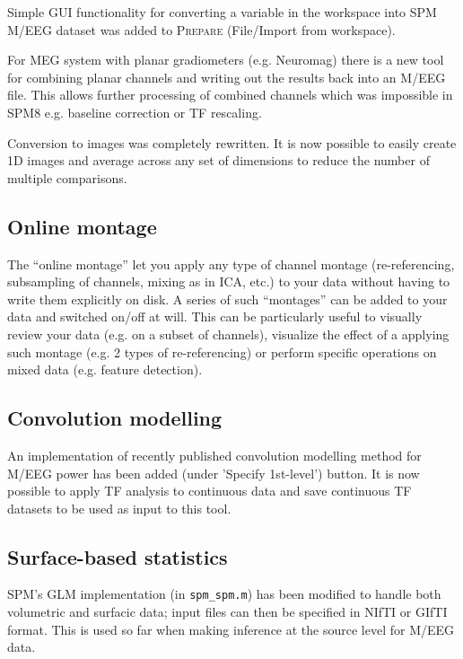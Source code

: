 \documentclass[a4paper,titlepage,openany]{article}
\begin{document}
Simple GUI functionality for converting a variable in the workspace into SPM M/EEG dataset was added to \textsc{Prepare} (File/Import from workspace).

For MEG system with planar gradiometers (e.g. Neuromag) there is a new tool for combining planar channels and writing out the results back into an M/EEG file. This allows further processing of combined channels which was impossible in SPM8 e.g. baseline correction or TF rescaling.

Conversion to images was completely rewritten. It is now possible to easily create 1D images and average across any set of dimensions to reduce the number of multiple comparisons.

\subsection{Online montage}

The ``online montage'' let you apply any type of channel montage (re-referencing, subsampling of channels, mixing as in ICA, etc.) to your data without having to write them explicitly on disk. A series of such ``montages'' can be added to your data and switched on/off at will. This can be particularly useful to visually review your data (e.g. on a subset of channels), visualize the effect of a applying such montage (e.g. 2 types of re-referencing) or perform specific operations on mixed data (e.g. feature detection).

\subsection{Convolution modelling}

An implementation of recently published convolution modelling method for M/EEG power \cite{Litvak_ConvModel_2013} has been added (under 'Specify 1st-level') button. It is now possible to apply TF analysis to continuous data and save continuous TF datasets to be used as input to this tool.

\subsection{Surface-based statistics}

SPM's GLM implementation (in \texttt{spm\_spm.m}) has been modified to handle both volumetric and surfacic data; input files can then be specified in NIfTI or GIfTI format. This is used so far when making inference at the source level for M/EEG data.
\end{document}

